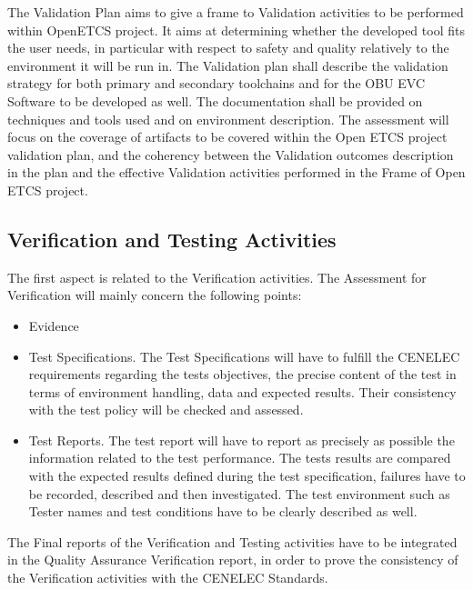 \documentclass{template/openetcs_article}
\begin{document}
The Validation Plan aims to give a frame to Validation activities to be performed within OpenETCS project. It aims at determining whether the developed tool fits the user needs, in particular with respect to safety and quality relatively to the environment it will be run in.
The Validation plan shall describe the validation strategy for both primary and secondary toolchains and for the OBU EVC Software to be developed as well. The documentation shall be provided on techniques and tools used and on environment description. The assessment will focus on the coverage of artifacts to be covered within the Open ETCS project validation plan, and the coherency between the Validation outcomes description in the plan and the effective Validation activities performed in the Frame of Open ETCS project.

\subsection{Verification and Testing Activities}
The first aspect is related to the Verification activities. The Assessment for Verification will mainly concern the following points:
\begin{itemize}
\item Evidence
\item Test Specifications. The Test Specifications will have to fulfill the CENELEC requirements regarding the tests objectives, the precise content of the test in terms of environment handling, data and expected results. Their consistency with the test policy will be checked and assessed.
\item  Test Reports. The test report will have to report as precisely as possible the information related to the test performance. The tests results are compared with the expected results defined during the test specification, failures have to be recorded, described and then investigated. The test environment such as Tester names and test conditions have to be clearly described as well.
\end{itemize}
The Final reports of the Verification and Testing activities have to be integrated in the Quality Assurance Verification report, in order to prove the consistency of the Verification activities with the CENELEC Standards.
\end{document}
